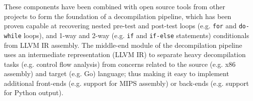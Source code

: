 These components have been combined with open source tools from other projects to form the foundation of a decompilation pipeline, which has been proven capable at recovering nested pre-test and post-test loops (e.g. \texttt{for} and \texttt{do-while} loops), and 1-way and 2-way (e.g. \texttt{if} and \texttt{if-else} statements) conditionals from LLVM IR assembly. The middle-end module of the decompilation pipeline uses an intermediate representation (LLVM IR) to separate heavy decompilation tasks (e.g. control flow analysis) from concerns related to the source (e.g. x86 assembly) and target (e.g. Go) language; thus making it easy to implement additional front-ends (e.g. support for MIPS assembly) or back-ends (e.g. support for Python output).
